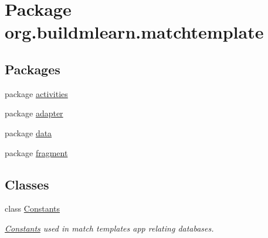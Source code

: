 \hypertarget{namespaceorg_1_1buildmlearn_1_1matchtemplate}{}\section{Package org.\+buildmlearn.\+matchtemplate}
\label{namespaceorg_1_1buildmlearn_1_1matchtemplate}
\subsection*{Packages}
\begin{DoxyCompactItemize}
\item 
package \hyperlink{namespaceorg_1_1buildmlearn_1_1matchtemplate_1_1activities}{activities}
\item 
package \hyperlink{namespaceorg_1_1buildmlearn_1_1matchtemplate_1_1adapter}{adapter}
\item 
package \hyperlink{namespaceorg_1_1buildmlearn_1_1matchtemplate_1_1data}{data}
\item 
package \hyperlink{namespaceorg_1_1buildmlearn_1_1matchtemplate_1_1fragment}{fragment}
\end{DoxyCompactItemize}
\subsection*{Classes}
\begin{DoxyCompactItemize}
\item 
class \hyperlink{classorg_1_1buildmlearn_1_1matchtemplate_1_1Constants}{Constants}
\begin{DoxyCompactList}\small\item\em \hyperlink{classorg_1_1buildmlearn_1_1matchtemplate_1_1Constants}{Constants} used in match template\textquotesingle{}s app relating databases. \end{DoxyCompactList}\end{DoxyCompactItemize}

